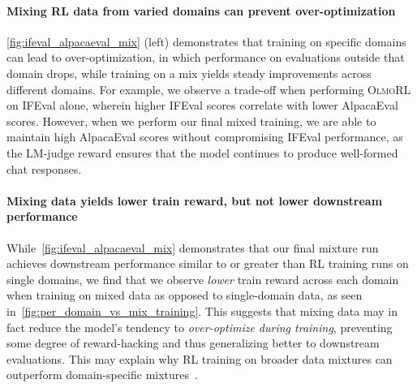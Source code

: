 \documentclass[table]{ai2style/ai2}
\newcommand{\newOlmo}{Olmo\xspace}
\newcommand{\olmothreerl}{\textsc{\newOlmo{}RL}\xspace}
\begin{document}
{{\paragraph{Mixing RL data from varied domains can prevent over-optimization}
\autoref{fig:ifeval_alpacaeval_mix} (left) demonstrates that training on specific domains can lead to over-optimization,
in which performance on evaluations outside that domain drops, while training on a mix yields steady improvements across
different domains. For example, we observe a trade-off when performing \olmothreerl on IFEval alone, wherein higher
IFEval scores correlate with lower AlpacaEval scores. However, when we perform our final mixed training,
we are able to maintain high AlpacaEval scores without compromising IFEval performance, as the LM-judge reward
ensures that the model continues to produce well-formed chat responses.

\paragraph{Mixing data yields lower train reward, but not lower downstream performance}
While~\autoref{fig:ifeval_alpacaeval_mix} demonstrates that our final mixture run achieves downstream performance similar to or greater than RL training runs on single domains, we find that we observe \textit{lower} train reward across each domain when training on mixed data as opposed to single-domain data, as seen in~\autoref{fig:per_domain_vs_mix_training}.
This suggests that mixing data may in fact reduce the model's tendency to \textit{over-optimize during training}, preventing some degree of reward-hacking and thus generalizing better to downstream evaluations. This may explain why RL training on broader data mixtures can outperform domain-specific mixtures~\citep{cheng2025revisiting}.

}}
\end{document}
